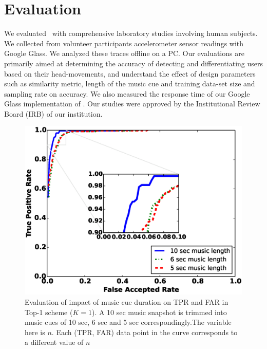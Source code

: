 \section{Evaluation}\label{sec:results}

We evaluated \systemname~with comprehensive laboratory studies involving 
human subjects. We collected from volunteer participants accelerometer sensor 
readings with Google Glass.
We analyzed these traces offline on a PC.
Our evaluations are primarily aimed at determining the accuracy of detecting 
and differentiating users based on their head-movements, and understand 
the effect of design parameters such as similarity metric, length of the music cue and training 
data-set size and sampling rate on accuracy. We also measured the response time of our Google 
Glass implementation of \systemname.
Our studies were approved by the Institutional Review Board (IRB) of our 
institution.


\begin{figure}[t]
\centering
\includegraphics [width=\columnwidth]{figure/top1_roc.eps}
\caption{Evaluation of impact of music cue duration on TPR and FAR in Top-1 
scheme ($K = 1$). A 10 sec music snapshot is trimmed into music cues of 10 
sec, 6 sec and 5 sec correspondingly.The variable here is $n$. Each (TPR, FAR) data point in the curve corresponds to a different value of $n$}
\label{fig:roc-top1}
\end{figure}


